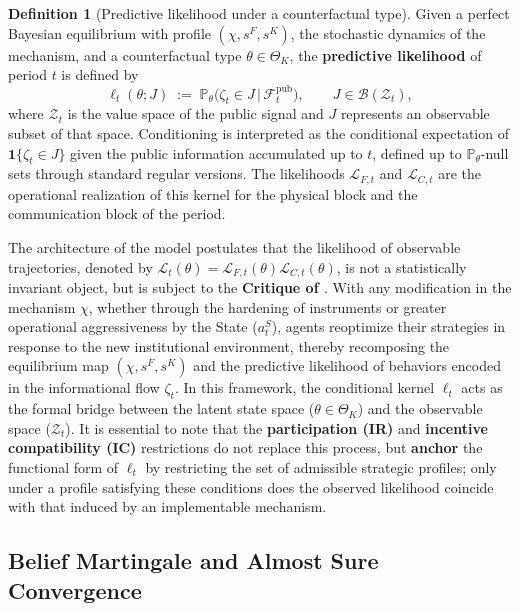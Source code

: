 \documentclass[12pt,a4paper]{article}
\providecommand{\textcite}{\citet}
\theoremstyle{plain}
\theoremstyle{definition}
\newtheorem{definition}[theorem]{Definition}
\theoremstyle{remark}
\newcommand{\ProbC}[1]{\mathbb{P}_{#1}}
\newcommand{\1}{\mathbf{1}}
\begin{document}
\begin{definition}[Predictive likelihood under a counterfactual type]
\label{def:predictive-likelihood}
Given a perfect Bayesian equilibrium with profile $(\chi,s^F,s^K)$, the stochastic
dynamics of the mechanism, and a counterfactual type $\theta\in\Theta_K$, the
\textbf{predictive likelihood} of period $t$ is defined by
\begin{equation}
\label{eq:likelihood-zeta}
\ell_t(\theta;J)\;:=\;\ProbC{\theta}\bigl(\zeta_t \in J \,\big|\, \mathcal{F}_t^{\mathrm{pub}}\bigr),
\qquad J\in\mathcal{B}(\mathcal{Z}_t),
\end{equation}
where $\mathcal{Z}_t$ is the value space of the public signal and $J$ represents an
observable subset of that space. Conditioning is interpreted as the conditional
expectation of $\mathbf{1}\{\zeta_t\in J\}$ given the public information accumulated up
to $t$, defined up to $\ProbC{\theta}$-null sets through standard regular versions.
The likelihoods $\mathcal{L}_{F,t}$ and $\mathcal{L}_{C,t}$ are the operational
realization of this kernel for the physical block and the communication block of the
period.
\end{definition}

The architecture of the model postulates that the likelihood of observable
trajectories, denoted by
$\mathcal{L}_t(\theta)=\mathcal{L}_{F,t}(\theta)\mathcal{L}_{C,t}(\theta)$, is not a
statistically invariant object, but is subject to the \textbf{Critique of
\textcite{Lucas1976}}. With any modification in the mechanism $\chi$, whether through
the hardening of instruments or greater operational aggressiveness by the State
($a_t^S$), agents reoptimize their strategies in response to the new institutional
environment, thereby recomposing the equilibrium map $(\chi,s^F,s^K)$ and the
predictive likelihood of behaviors encoded in the informational flow $\zeta_t$. In this
framework, the conditional kernel $\ell_t$ acts as the formal bridge between the latent
state space ($\theta\in\Theta_K$) and the observable space ($\mathcal{Z}_t$). It is
essential to note that the \textbf{participation (IR)} and \textbf{incentive
compatibility (IC)} restrictions \textcite{Myerson1979IC,BoltonDewatripont2005} do not
replace this process, but \textbf{anchor} the functional form of $\ell_t$ by restricting
the set of admissible strategic profiles; only under a profile satisfying these
conditions does the observed likelihood coincide with that induced by an implementable
mechanism.

\subsection{Belief Martingale and Almost Sure Convergence}
\end{document}
